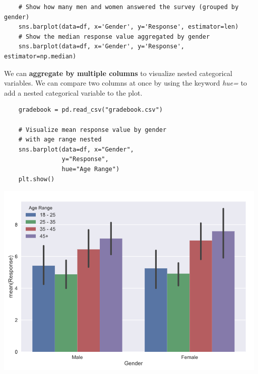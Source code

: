\documentclass[11pt, a4paper]{article}
\begin{document}
\begin{spacing}{1.1}
\begin{lstlisting}
	# Show how many men and women answered the survey (grouped by gender)
	sns.barplot(data=df, x='Gender', y='Response', estimator=len)
	# Show the median response value aggregated by gender
	sns.barplot(data=df, x='Gender', y='Response', estimator=np.median)\end{lstlisting}\newpage
	
	\noindent We can \textbf{aggregate by multiple columns} to visualize nested categorical variables. We can compare two columns at once by using the keyword \textit{hue=} to add a nested categorical variable to the plot.
	\begin{minipage}[c]{9cm}
	\begin{lstlisting}
	gradebook = pd.read_csv("gradebook.csv")
	
	# Visualize mean response value by gender 
	# with age range nested
	sns.barplot(data=df, x="Gender", 
 	            y="Response", 
	            hue="Age Range")
	plt.show() \end{lstlisting}\vspace*{1mm}
	\end{minipage}
	\begin{minipage}[c]{10cm}
		\hspace*{5mm} \includegraphics[scale=.5]{seamult}
	\end{minipage} \\

\end{spacing}
\end{document}
